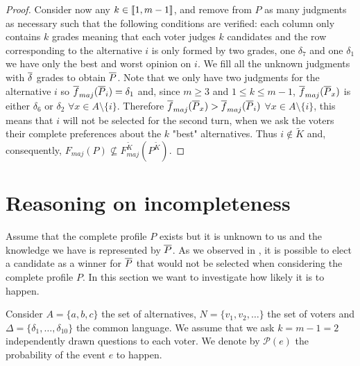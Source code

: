\documentclass[version=3.21, pagesize, twoside=off, bibliography=totoc, DIV=calc, fontsize=12pt, a4paper]{scrartcl}
\begin{document}
\begin{proof}
	Consider now any $k \in \llbracket1,m-1\rrbracket$, and remove from $P$ as many judgments as necessary such that the following conditions are verified: each column only contains $k$ grades \textemdash meaning that each voter judges $k$ candidates \textemdash and the row corresponding to the alternative $i$ is only formed by two grades, one $\delta_7$ and one $\delta_1$ \textemdash we have only the best and worst opinion on $i$. We fill all the unknown judgments with $\overline{\delta}$ grades to obtain $\overline{P}$. Note that we only have two judgments for the alternative $i$ so $\overline{f}_{maj}(\overline{P}_i)=\delta_1$ and, since $m\geq3$ and $1 \leq k \leq m-1$, $\overline{f}_{maj}(\overline{P}_x)$ is either $\delta_6$ or $\delta_2$ $\forall x \in A \setminus \{i\}$. Therefore $\overline{f}_{maj}(\overline{P}_x) > \overline{f}_{maj}(\overline{P}_i)$ $\forall x \in A \setminus \{i\}$, this means that $i$ will not be selected for the second turn, when we ask the voters their complete preferences about the $k$ "best" alternatives. Thus $i \notin \tilde{K}$ and, consequently, $F_{maj}(P) \nsubseteq F^{\tilde{K}}_{maj}(P^{\tilde{K}})$.
\end{proof}


\section{Reasoning on incompleteness}

Assume that the complete profile $P$ exists but it is unknown to us and the knowledge we have is represented by $\overline{P}$. As we observed in , it is possible to elect a candidate as a winner for $\overline{P}$ that would not be selected when considering the complete profile $P$. In this section we want to investigate how likely it is to happen.

Consider $A=\{a,b,c\}$ the set of alternatives, $N=\{v_1,v_2, \dots\}$ the set of voters and $\Delta=\{\delta_1, \dots, \delta_{10}\}$ the common language. We assume that we ask $k=m-1=2$ independently drawn questions to each voter. We denote by $\mathcal{P}(e)$ the probability of the event $e$ to happen.
\end{document}
